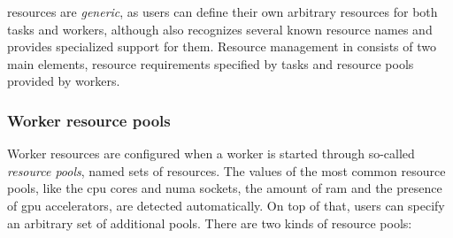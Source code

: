 \hyperqueue{} resources are \emph{generic}, as users can define their own
arbitrary resources for both tasks and workers, although \hq{} also recognizes
several known resource names and provides specialized support for them. Resource management in
\hyperqueue{} consists of two main elements, resource requirements specified by tasks and
resource pools provided by workers.

\subsubsection*{Worker resource pools}
Worker resources are configured when a worker is started through so-called \emph{resource pools},
named sets of resources. The values of the most common resource pools, like the
\gls{cpu} cores and \gls{numa} sockets, the amount of
\gls{ram} and the presence of \gls{gpu} accelerators, are detected
automatically. On top of that, users can specify an arbitrary set of additional pools. There are
two kinds of resource pools:


